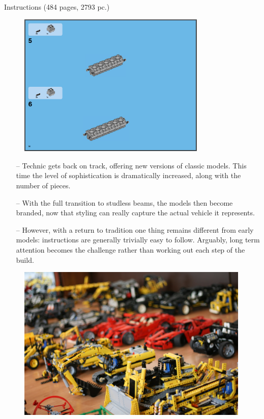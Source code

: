 \documentclass[xcolor=dvipsnames]{beamer}
\begin{document}
\begin{frame}[fragile]{Instructions (484 pages, 2793 pc.)}
\begin{figure}[H]
 \centering
 \includegraphics[width=0.8\textwidth]{2015_42043_instructions.png}
\end{figure}
\end{frame}


\begin{frame}[fragile]{}
\begin{itemize}
\item[--] Technic gets back on track, offering new versions of classic models. This time the level of sophistication is dramatically increased, along with the number of pieces. \vspace{3mm}
\item[--] With the full transition to studless beams, the models then become branded, now that styling can really capture the actual vehicle it represents. \vspace{3mm}
\item[--] However, with a return to tradition one thing remains different from early models: instructions are generally trivially easy to follow. Arguably, long term attention becomes the challenge rather than working out each step of the build. \vspace{3mm}
\end{itemize}
\end{frame}


\begin{frame}[fragile]{}
\begin{figure}[H]
 \centering
 \includegraphics[width=0.99\textwidth]{0-1-lego-technic-collection-2_resize.jpg}
\end{figure}
\end{frame}


\begin{frame}[plain]
  \titlepage
\end{frame}
\end{document}
